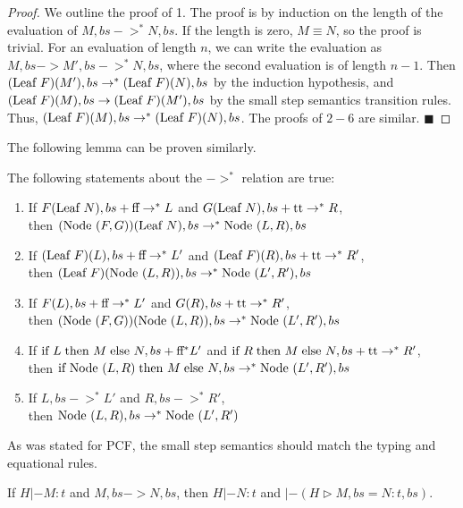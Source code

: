 \begin{proof}
We outline the proof of 1.  The proof is by induction on the length of the evaluation of 
$M, bs->^{*}N, bs$.  If the length is zero, $M\equiv N$, so the proof is trivial.  For an evaluation of length $n$, we can write the evaluation as $M, bs->M', bs->^{*}N, bs$, where the second evaluation is of length $n-1$.  Then $(\textrm{Leaf } F)(M'), bs->^{*}(\textrm{Leaf } F)(N), bs$ by the induction hypothesis, and $(\textrm{Leaf } F)(M), bs ->(\textrm{Leaf } F)(M'), bs$ by the small step semantics transition rules.  Thus, $(\textrm{Leaf } F)(M), bs->^{*}(\textrm{Leaf } F)(N), bs$.  The proofs of $2-6$ are similar.
\hfill $\blacksquare$
\end{proof}

The following lemma can be proven similarly.
\begin{lemma} \label{small2}
The following statements about the $->^{*}$ relation are true:
\begin{enumerate}

\item If $F(\textrm{Leaf } N),bs+\textrm{ff }\!\! ->^{*} L$ and $G(\textrm{Leaf } N),bs+\textrm{tt }\!\! ->^{*} R$, \\then $(\textrm{Node }(F,G))(\textrm{Leaf } N), bs ->^{*} \textrm{Node }(L,R), bs$
\item If $(\textrm{Leaf } F)(L), bs+\textrm{ff }\!\! ->^{*}L'$ and $(\textrm{Leaf } F)(R), bs+\textrm{tt }\!\! ->^{*}R'$, \\then $(\textrm{Leaf } F)(\textrm{Node }(L,R)), bs ->^{*} \textrm{Node }(L',R'), bs$
\item If $F(L), bs+\textrm{ff }\!\! ->^{*} L'$ and $G(R), bs+\textrm{tt }\!\! ->^{*} R'$, \\then $(\textrm{Node }(F,G))(\textrm{Node }(L,R)), bs ->^{*} \textrm{Node }(L',R'), bs$
\item If $\textrm{if } L\;\textrm{then } M\;\textrm{else } N, bs+\textrm{ff }\!\! ^{*} L'$ and $ 
\textrm{if } R\;\textrm{then } M\;\textrm{else } N, bs+\textrm{tt }\!\! ->^{*} R'$, \\then 
$\textrm{if } \textrm{Node } (L,R)\;\textrm{then } M\;\textrm{else } N, bs ->^{*} \textrm{Node } (L',R'), bs$
\item If $L,bs ->^{*} L'$ and $R,bs ->^{*} R'$, \\then
$\textrm{Node }(L,R),bs ->^{*} \textrm{Node }(L',R')$
\end{enumerate}

\end{lemma}

As was stated for PCF, the small step semantics should match the typing and equational rules.

\begin{theorem}
If $H|-M:t$ and $M, bs->N, bs$, then $H|-N:t$ and $|-(H\triangleright M, bs=N:t, bs)$.
\end{theorem}

